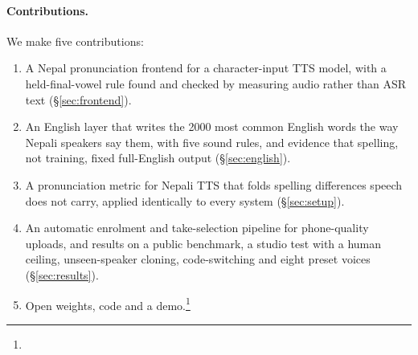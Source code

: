 \paragraph{Contributions.} We make five contributions:
\begin{enumerate}
  \setlength\itemsep{0pt}
  \item A Nepal pronunciation frontend for a character-input TTS model, with a held-final-vowel rule found and checked by measuring audio rather than ASR text (\S\ref{sec:frontend}).
  \item An English layer that writes the 2000 most common English words the way Nepali speakers say them, with five sound rules, and evidence that spelling, not training, fixed full-English output (\S\ref{sec:english}).
  \item A pronunciation metric for Nepali TTS that folds spelling differences speech does not carry, applied identically to every system (\S\ref{sec:setup}).
  \item An automatic enrolment and take-selection pipeline for phone-quality uploads, and results on a public benchmark, a studio test with a human ceiling, unseen-speaker cloning, code-switching and eight preset voices (\S\ref{sec:results}).
  \item Open weights, code and a demo.\footnote{\artifactnote}
\end{enumerate}
